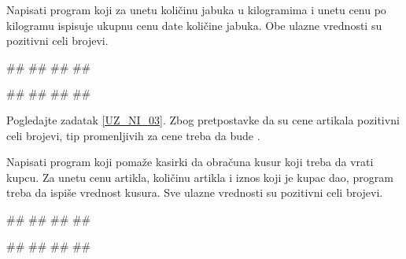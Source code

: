 \begin{Exercise}[label=UZ_NI_05]
Napisati program koji za unetu količinu jabuka u kilogramima i unetu
cenu po kilogramu ispisuje ukupnu cenu date količine jabuka. 
Obe ulazne vrednosti su pozitivni celi brojevi.

\begin{miditest}
\begin{upotreba}{1}
#\naslovInt#
##
##
##
\end{upotreba}
\end{miditest}
\begin{miditest}
\begin{upotreba}{1}
#\naslovInt#
##
##
##
\end{upotreba}
\end{miditest}
\end{Exercise}
\ifresenja
\begin{Answer}[ref=UZ_NI_05]
Pogledajte zadatak \ref{UZ_NI_03}. Zbog pretpostavke da su cene artikala pozitivni celi brojevi, 
tip promenljivih za cene treba da bude .
\sstrana
\end{Answer}
\fi


\begin{Exercise}[label=UZ_NI_06] 
Napisati program koji pomaže kasirki da obračuna kusur koji treba da vrati kupcu. 
Za unetu cenu artikla, količinu artikla i iznos koji je kupac dao, program treba da 
ispiše vrednost kusura. Sve ulazne vrednosti su pozitivni celi brojevi. 

\begin{miditest}
\begin{upotreba}{1}
#\naslovInt#
##
##
##
\end{upotreba}
\end{miditest}
\begin{miditest}
\begin{upotreba}{2}
#\naslovInt#
##
##
##
\end{upotreba}
\end{miditest}

\end{Exercise}
\ifresenja
\begin{Answer}[ref=UZ_NI_06]
\end{Answer}
\fi


